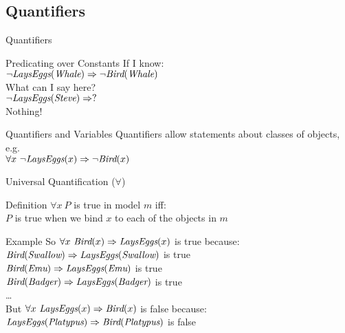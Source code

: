 \documentclass[14pt]{beamer}
\begin{document}
\subsection{Quantifiers}
\begin{frame}{Quantifiers}
	\begin{block}{Predicating over Constants}
		If I know: \\
		\tab$\lnot\textit{LaysEggs}(\textit{Whale}) \Rightarrow \lnot\textit{Bird}(\textit{Whale})$ \\[.5em]
		What can I say here? \\
		\tab$\lnot\textit{LaysEggs}(\textit{Steve}) \Rightarrow ?$ \\[.5em]
		\pause
		\alert{Nothing!}
	\end{block}
	\pause
	\begin{block}{Quantifiers and Variables}
		Quantifiers allow statements about classes of objects, e.g. \\
		\tab$\forall x\ \lnot\textit{LaysEggs}(x) \Rightarrow \lnot\textit{Bird}(x)$
	\end{block}
\end{frame}
\begin{frame}{Universal Quantification ($\forall$)}
	\begin{block}{Definition}
		$\forall x\ P$ is true in model $m$ iff: \\
		\tab$P$ is true when we bind $x$ to \alert{each} of the objects in $m$
	\end{block}
	\pause
	\begin{block}{Example}
		So $\forall x\ \textit{Bird}(x) \limpl \textit{LaysEggs}(x)$ is true because: \\
		\tab$\textit{Bird}(\textit{Swallow}) \Rightarrow \textit{LaysEggs}(\textit{Swallow})$ is true \\
		\tab$\textit{Bird}(\textit{Emu}) \Rightarrow \textit{LaysEggs}(\textit{Emu})$ is true \\
		\tab$\textit{Bird}(\textit{Badger}) \Rightarrow \textit{LaysEggs}(\textit{Badger})$ is true \\
		\tab\ldots \\[.5em]
		\pause
		But $\forall x\ \textit{LaysEggs}(x) \Rightarrow \textit{Bird}(x)$ is false because: \\
		\pause
		\tab$\textit{LaysEggs}(\textit{Platypus}) \Rightarrow \textit{Bird}(\textit{Platypus})$ is false
	\end{block}
\end{frame}
\end{document}
